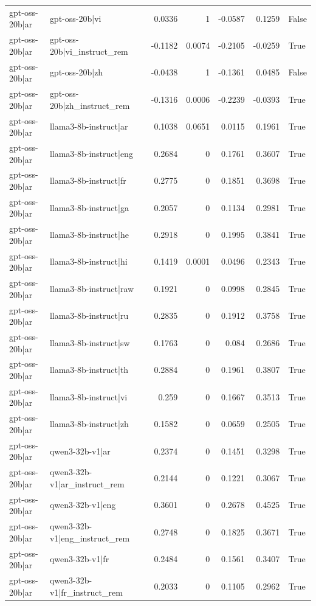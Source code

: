 \begin{table}
\begin{tabular}{l l r r r r l}
gpt-oss-20b|ar & gpt-oss-20b|vi & 0.0336 & 1 & -0.0587 & 0.1259 & False \\
gpt-oss-20b|ar & gpt-oss-20b|vi_instruct_rem & -0.1182 & 0.0074 & -0.2105 & -0.0259 & True \\
gpt-oss-20b|ar & gpt-oss-20b|zh & -0.0438 & 1 & -0.1361 & 0.0485 & False \\
gpt-oss-20b|ar & gpt-oss-20b|zh_instruct_rem & -0.1316 & 0.0006 & -0.2239 & -0.0393 & True \\
gpt-oss-20b|ar & llama3-8b-instruct|ar & 0.1038 & 0.0651 & 0.0115 & 0.1961 & True \\
gpt-oss-20b|ar & llama3-8b-instruct|eng & 0.2684 & 0 & 0.1761 & 0.3607 & True \\
gpt-oss-20b|ar & llama3-8b-instruct|fr & 0.2775 & 0 & 0.1851 & 0.3698 & True \\
gpt-oss-20b|ar & llama3-8b-instruct|ga & 0.2057 & 0 & 0.1134 & 0.2981 & True \\
gpt-oss-20b|ar & llama3-8b-instruct|he & 0.2918 & 0 & 0.1995 & 0.3841 & True \\
gpt-oss-20b|ar & llama3-8b-instruct|hi & 0.1419 & 0.0001 & 0.0496 & 0.2343 & True \\
gpt-oss-20b|ar & llama3-8b-instruct|raw & 0.1921 & 0 & 0.0998 & 0.2845 & True \\
gpt-oss-20b|ar & llama3-8b-instruct|ru & 0.2835 & 0 & 0.1912 & 0.3758 & True \\
gpt-oss-20b|ar & llama3-8b-instruct|sw & 0.1763 & 0 & 0.084 & 0.2686 & True \\
gpt-oss-20b|ar & llama3-8b-instruct|th & 0.2884 & 0 & 0.1961 & 0.3807 & True \\
gpt-oss-20b|ar & llama3-8b-instruct|vi & 0.259 & 0 & 0.1667 & 0.3513 & True \\
gpt-oss-20b|ar & llama3-8b-instruct|zh & 0.1582 & 0 & 0.0659 & 0.2505 & True \\
gpt-oss-20b|ar & qwen3-32b-v1|ar & 0.2374 & 0 & 0.1451 & 0.3298 & True \\
gpt-oss-20b|ar & qwen3-32b-v1|ar_instruct_rem & 0.2144 & 0 & 0.1221 & 0.3067 & True \\
gpt-oss-20b|ar & qwen3-32b-v1|eng & 0.3601 & 0 & 0.2678 & 0.4525 & True \\
gpt-oss-20b|ar & qwen3-32b-v1|eng_instruct_rem & 0.2748 & 0 & 0.1825 & 0.3671 & True \\
gpt-oss-20b|ar & qwen3-32b-v1|fr & 0.2484 & 0 & 0.1561 & 0.3407 & True \\
gpt-oss-20b|ar & qwen3-32b-v1|fr_instruct_rem & 0.2033 & 0 & 0.1105 & 0.2962 & True \\

\end{tabular}
\end{table}
